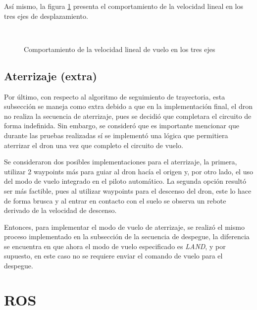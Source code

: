 Así mismo, la figura \ref{fig:pymav_missionv} presenta el comportamiento de la velocidad lineal en los tres ejes de desplazamiento.

\begin{figure}[ht]
    \centering
    \hfill
    \\
    \hfill

    \caption{Comportamiento de la velocidad lineal de vuelo en los tres ejes}
    \label{fig:pymav_missionv}
\end{figure}


\subsection{Aterrizaje (extra)}

Por último, con respecto al algoritmo de seguimiento de trayectoria, esta subsección se maneja como extra debido a que en la implementación final, el dron no realiza la secuencia de aterrizaje, pues se decidió que completara el circuito de forma indefinida. Sin embargo, se consideró que es importante mencionar que durante las pruebas realizadas sí se implementó una lógica que permitiera aterrizar el dron una vez que completo el circuito de vuelo. 

Se consideraron dos posibles implementaciones para el aterrizaje, la primera, utilizar 2 waypoints más para guiar al dron hacía el origen y, por otro lado, el uso del modo de vuelo integrado en el piloto automático. La segunda opción resultó ser más factible, pues al utilizar waypoints para el descenso del dron, este lo hace de forma brusca y al entrar en contacto con el suelo se observa un rebote derivado de la velocidad de descenso.

Entonces, para implementar el modo de vuelo de aterrizaje, se realizó el mismo proceso implementado en la subsección de la secuencia de despegue, la diferencia se encuentra en que ahora el modo de vuelo especificado es \textit{LAND}, y por supuesto, en este caso no se requiere enviar el comando de vuelo para el despegue.


\section{ROS}







